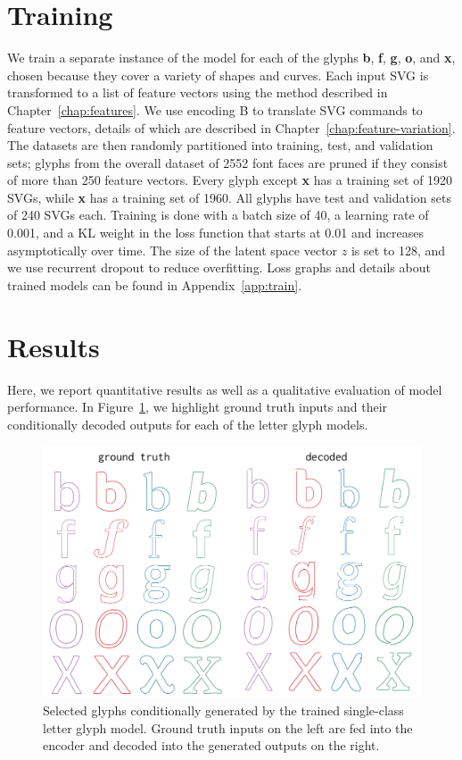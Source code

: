 \section{Training}\label{sec:training}
We train a separate instance of the model for each of the glyphs \textbf{b}, \textbf{f}, \textbf{g}, \textbf{o}, and \textbf{x}, chosen because they cover a variety of shapes and curves.
Each input SVG is transformed to a list of feature vectors using the method described in Chapter~\ref{chap:features}.
We use encoding B to translate SVG commands to feature vectors, details of which are described in Chapter~\ref{chap:feature-variation}.
The datasets are then randomly partitioned into training, test, and validation sets; glyphs from the overall dataset of 2552 font faces are pruned if they consist of more than 250 feature vectors.
Every glyph except \textbf{x} has a training set of 1920 SVGs, while \textbf{x} has a training set of 1960.
All glyphs have test and validation sets of 240 SVGs each.
Training is done with a batch size of 40, a learning rate of 0.001, and a KL weight in the loss function that starts at 0.01 and increases asymptotically over time.
The size of the latent space vector $z$ is set to 128, and we use recurrent dropout to reduce overfitting.
Loss graphs and details about trained models can be found in Appendix~\ref{app:train}.

\section{Results}
Here, we report quantitative results as well as a qualitative evaluation of model performance.
In Figure~\ref{fig:font_gen}, we highlight ground truth inputs and their conditionally decoded outputs for each of the letter glyph models.
\begin{figure}[h]
    \centering
	\includegraphics[width=\textwidth]{figures/font_gen}
    \caption[Visual results of training single-class model on letter glyph datasets]
    {Selected glyphs conditionally generated by the trained single-class letter glyph model.
    Ground truth inputs on the left are fed into the encoder and decoded into the generated outputs on the right.\label{fig:font_gen}}
\end{figure}

